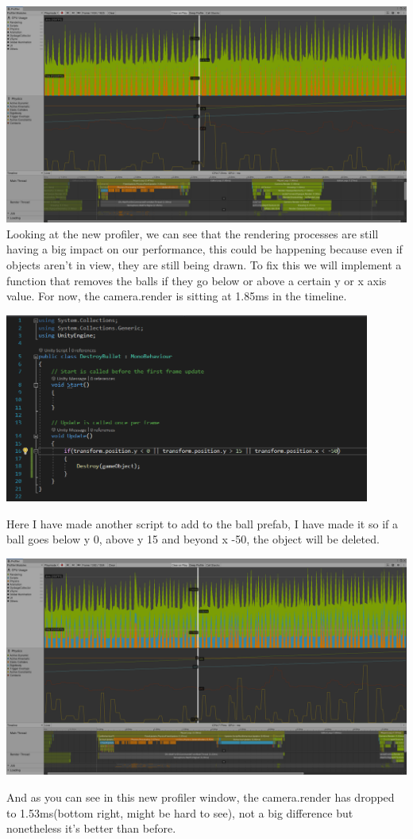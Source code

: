 \documentclass{article}
\begin{document}
\paragraph{}

\includegraphics[width=15cm]{images/profiler1.png}
Looking at the new profiler, we can see that the rendering processes are still having a big impact on our performance, this could be happening because even if objects aren't in view, they are still being drawn. To fix this we will implement a function that removes the balls if they go below or above a certain y or x axis value. For now, the camera.render is sitting at 1.85ms in the timeline.

\includegraphics[width=12cm]{images/code3.png}\par
Here I have made another script to add to the ball prefab, I have made it so if a ball goes below y 0, above y 15 and beyond x -50, the object will be deleted. 
\newpage

\includegraphics[width=15cm]{images/profiler3.png}\par
And as you can see in this new profiler window, the camera.render has dropped to 1.53ms(bottom right, might be hard to see), not a big difference but nonetheless it's better than before.
\end{document}
